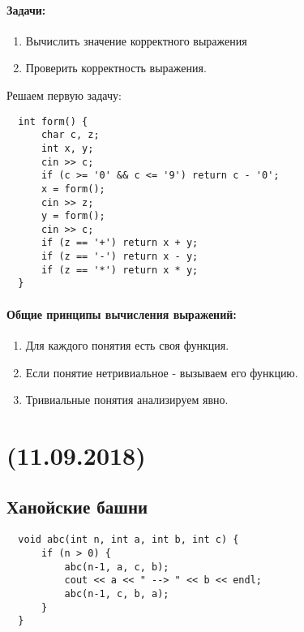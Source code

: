 \documentclass{article}
\begin{document}
\paragraph{Задачи:}

\begin{enumerate}
\item
  Вычислить значение корректного выражения
\item
  Проверить корректность выражения.
\end{enumerate}

\newpage
Решаем первую задачу:

\begin{lstlisting}
  int form() {
      char c, z;
      int x, y;
      cin >> c;
      if (c >= '0' && c <= '9') return c - '0';
      x = form();
      cin >> z;
      y = form();
      cin >> c;
      if (z == '+') return x + y;
      if (z == '-') return x - y;
      if (z == '*') return x * y;
  }
\end{lstlisting}

\paragraph{Общие принципы вычисления выражений:}

\begin{enumerate}
\item
  Для каждого понятия есть своя функция.
\item
  Если понятие нетривиальное - вызываем его функцию.
\item
  Тривиальные понятия анализируем явно.
\end{enumerate}

\newpage

\noindent\makebox[\linewidth]{\rule{\paperwidth}{0.4pt}}
\section{(11.09.2018)}
\noindent\makebox[\linewidth]{\rule{\paperwidth}{0.4pt}}

\subsection{Ханойские башни}

\begin{lstlisting}
  void abc(int n, int a, int b, int c) {
      if (n > 0) {
          abc(n-1, a, c, b);
          cout << a << " --> " << b << endl;
          abc(n-1, c, b, a);
      }
  }
\end{lstlisting}
\end{document}
